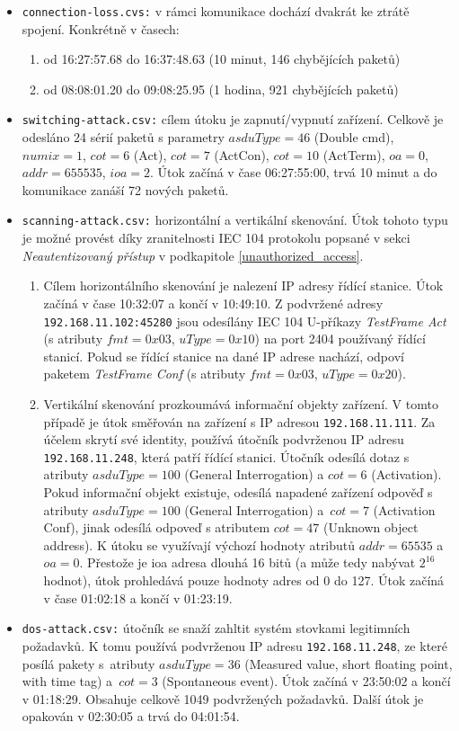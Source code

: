 \begin{itemize}
    \item \texttt{connection-loss.cvs:} v rámci komunikace dochází dvakrát ke ztrátě spojení. Konkrétně v časech:
    \begin{enumerate}
        \item od 16:27:57.68 do 16:37:48.63 (10 minut, 146 chybějících paketů)
        \item od 08:08:01.20 do 09:08:25.95 (1 hodina, 921 chybějících paketů)
    \end{enumerate}
    \item \texttt{switching-attack.csv:} cílem útoku je zapnutí/vypnutí zařízení. Celkově je odesláno 24 sérií paketů s parametry $asduType=46$ (Double cmd), $numix=1$, $cot=6$ (Act), $cot=7$ (ActCon), $cot=10$ (ActTerm), $oa=0$, $addr=655535$, $ioa=2$. Útok začíná v čase 06:27:55:00, trvá 10 minut a do komunikace zanáší 72 nových paketů.
    
    \item \texttt{scanning-attack.csv:}
    horizontální a vertikální skenování. Útok tohoto typu je možné provést díky zranitelnosti IEC 104 protokolu popsané v sekci \emph{Neautentizovaný přístup} v podkapitole \ref{unauthorized_access}.
    \begin{enumerate}
        \item 
        Cílem horizontálního skenování je nalezení IP adresy řídící stanice. Útok začíná v čase 10:32:07 a končí v 10:49:10.
        Z podvržené adresy \texttt{192.168.11.102:45280} jsou odesílány IEC 104 U-příkazy \emph{TestFrame Act} (s atributy $fmt=0x03$, $uType=0x10$) na port 2404 používaný řídící stanicí. Pokud se řídící stanice na dané IP adrese nachází, odpoví paketem \emph{TestFrame Conf} (s atributy $fmt=0x03$, $uType=0x20$).
    
        \item 
        \sloppy Vertikální skenování prozkoumává informační objekty zařízení. V tomto případě je útok směřován na zařízení s IP adresou \texttt{192.168.11.111}. Za účelem skrytí své identity, používá útočník podvrženou IP adresu \texttt{192.168.11.248}, která patří řídící stanici. Útočník odesílá dotaz s atributy $asduType=100$ (General Interrogation) a $cot=6$ (Activation). Pokud  informační objekt existuje, odesílá napadené zařízení odpověď s atributy $asduType=100$ (General Interrogation) a~$cot=7$ (Activation Conf), jinak odesílá odpoveď s atributem $cot=47$ (Unknown object address). K útoku se využívají výchozí hodnoty atributů $addr=65535$ a~$oa=0$. Přestože je ioa adresa dlouhá 16 bitů (a může tedy nabývat $2^{16}$ hodnot), útok prohledává pouze hodnoty adres od 0 do 127. Útok začíná v čase 01:02:18 a končí v 01:23:19.
    \end{enumerate}
    \item \texttt{dos-attack.csv:}
    útočník se snaží zahltit systém stovkami legitimních požadavků. K tomu používá podvrženou IP adresu \texttt{192.168.11.248}, ze které posílá pakety s~atributy $asduType=36$ (Measured value, short floating point, with time tag) a~$cot=3$ (Spontaneous event). Útok začíná v 23:50:02 a končí v 01:18:29. Obsahuje celkově 1049 podvržených požadavků. Další útok je opakován v 02:30:05 a trvá do 04:01:54.
    

\end{itemize}

